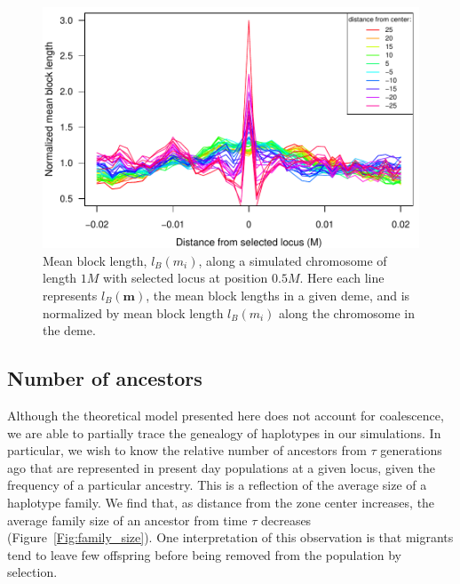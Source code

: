 \documentclass[12pt]{article}
\begin{document}
\begin{figure}
\includegraphics{figs/blocksAlongChromAncBConditioning}
\caption{Mean block length, $l_B(m_i)$, along a simulated chromosome of length $1M$ with selected locus at position $0.5M$. Here each line represents  $l_B(\mathbf{m})$, the mean block lengths in a given deme, and is normalized by mean block length $l_B(m_i)$ along the chromosome in the deme.}\label{Fig:blockLengths}
\end{figure}

\subsection*{Number of ancestors}
Although the theoretical model presented here does not account for coalescence, we are able to partially trace the genealogy of haplotypes in our simulations. In particular, we wish to know the relative number of ancestors from $\tau$ generations ago that are represented in present day populations at a given locus, given the frequency of a particular ancestry. This is a reflection of the average size of a haplotype family. We find that, as distance from the zone center increases, the average family size of an ancestor from time $\tau$ decreases (Figure~\ref{Fig:family_size}). One interpretation of this observation is that migrants tend to leave few offspring before being removed from the population by selection. 
\end{document}
